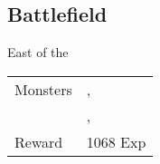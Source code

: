 \subsection{Battlefield}
\label{map:battlefield_18}

East of the 

\noindent\begin{tabularx}{\textwidth}[l]{lX}
	Monsters
	& \nameref{monster:stheno}, \nameref{monster:stheno} \\
	& \nameref{monster:Iflyte}, \nameref{monster:Iflyte}
\\ \hline
	Reward & 1068 Exp
\end{tabularx}
